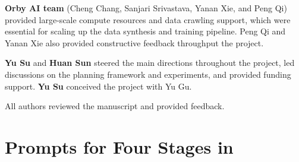 \textbf{Orby AI team} (Cheng Chang, Sanjari Srivastava, Yanan Xie, and Peng Qi) provided large-scale compute resources and data crawling support, which were essential for scaling up the data synthesis and training pipeline. Peng Qi and Yanan Xie also provided constructive feedback throughput the project.

\textbf{Yu Su} and \textbf{Huan Sun} steered the main directions throughout the project, led discussions on the planning framework and experiments, and provided funding support.
\textbf{Yu Su} conceived the project with Yu Gu.

All authors reviewed the manuscript and provided feedback.




\section{Prompts for Four Stages in \OurMethod}
\label{appendix:prompts}
